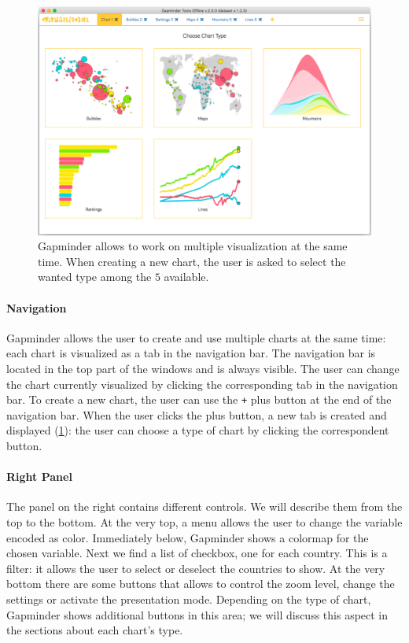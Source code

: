 \begin{figure}[h]
	\centering
	\includegraphics[width=0.95\columnwidth]{figures/home}
	\caption{Gapminder allows to work on multiple visualization at the same time. When creating a new chart, the user is asked to select the wanted type among the $5$ available.}
	\label{fig:home}
\end{figure}

\paragraph{Navigation}
Gapminder allows the user to create and use multiple charts at the same time: each chart is visualized as a tab in the navigation bar.
The navigation bar is located in the top part of the windows and is always visible.
The user can change the chart currently visualized by clicking the corresponding tab in the navigation bar.
To create a new chart, the user can use the \texttt{+} plus button at the end of the navigation bar.
When the user clicks the plus button, a new tab is created and displayed (\cref{fig:home}):
the user can choose a type of chart by clicking the correspondent button.

\paragraph{Right Panel}
The panel on the right contains different controls.
We will describe them from the top to the bottom.
At the very top, a menu allows the user to change the variable encoded as color.
Immediately below, Gapminder shows a colormap for the chosen variable.
Next we find a list of checkbox, one for each country.
This is a filter: it allows the user to select or deselect the countries to show.
At the very bottom there are some buttons that allows to control the zoom level, change the settings or activate the presentation mode.
Depending on the type of chart, Gapminder shows additional buttons in this area;
we will discuss this aspect in the sections about each chart's type.

